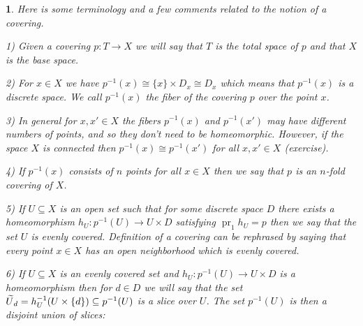 \documentclass[11pt, letterpaper, oneside]{report}
\theoremstyle{pplain}
\theoremstyle{ddefinition}
\theoremstyle{nnn}
\newtheorem{nn}[theorem]{}
\theoremstyle{eexercise}
\newcommand{\nwidetilde}{\skew{4}\widetilde}
\DeclareMathOperator\pr{pr}
\begin{document}
\begin{nn} Here is some terminology and a few comments related to the notion of a covering. 

1) Given a covering $p\colon T\to X$ we will say that $T$ is the \emph{total space}
of $p$ and that $X$ is the \emph{base space}. 

2) For $x\in X$ we have $p^{-1}(x) \cong \{x\} \times D_{x}\cong D_{x}$ which means that $p^{-1}(x)$ is
a discrete space. We call $p^{-1}(x)$ the \emph{fiber} of the covering $p$ over the point $x$. 

3) In general for  $x, x'\in X$ the fibers $p^{-1}(x)$ and $p^{-1}(x')$ may have different numbers
of points, and so they don't need to be homeomorphic. However, if the space $X$ is connected then 
$p^{-1}(x)\cong p^{-1}(x')$ for all $x, x'\in X$ (exercise). 

4) If $p^{-1}(x)$ consists of $n$ points for all $x\in X$ then  we say that $p$ is an $n$-fold covering of $X$. 

5) If $U\subseteq X$ is an open set such that for some discrete space $D$ there exists a homeomorphism 
$h_{U}\colon p^{-1}(U) \to U\times D$ satisfying $\pr_{1}h_{U} = p$ then we say that the set $U$ is 
\emph{evenly covered}. Definition of a covering can be  rephrased by saying that every point $x\in X$
has an open neighborhood which is evenly covered. 

6) If  $U\subseteq X$ is an evenly covered set  and $h_{U}\colon p^{-1}(U) \to U\times D$ is a homeomorphism 
then for $d\in D$ we will say that the set $\nwidetilde{U}_{d} = h^{-1}_{U}(U\times \{d\}) \subseteq p^{-1}(U)$ 
is a \emph{slice} over $U$. The set $p^{-1}(U)$ is then a disjoint union of slices: 

\ 

\begin{tikzpicture}


\end{tikzpicture}
\end{nn}
\end{document}
